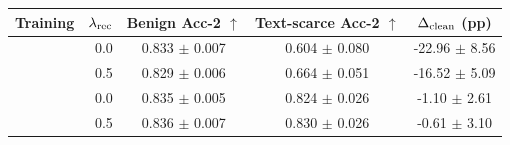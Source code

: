 \begin{tabular}{lrccc}
\toprule
Training & $\lambda_{\rm rec}$ & Benign Acc-2 $\uparrow$ & Text-scarce Acc-2 $\uparrow$ & $\Delta_{\rm clean}$ (pp) \\
\midrule
\tokenlevel{} & 0.0 & 0.833 $\pm$ 0.007 & 0.604 $\pm$ 0.080 & -22.96 $\pm$ 8.56 \\
\tokenlevel{} & 0.5 & 0.829 $\pm$ 0.006 & 0.664 $\pm$ 0.051 & -16.52 $\pm$ 5.09 \\
\modlevel{} & 0.0 & 0.835 $\pm$ 0.005 & 0.824 $\pm$ 0.026 & -1.10 $\pm$ 2.61 \\
\modlevel{} & 0.5 & 0.836 $\pm$ 0.007 & 0.830 $\pm$ 0.026 & -0.61 $\pm$ 3.10 \\
\bottomrule
\end{tabular}
